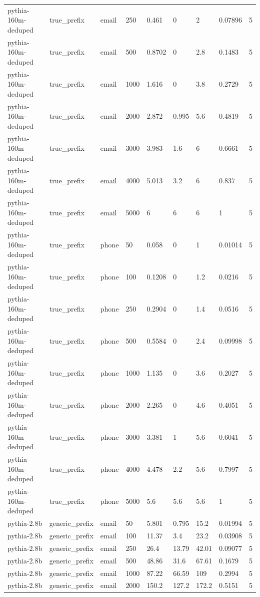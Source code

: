 \begin{tabular}{lllllllll}
pythia-160m-deduped & true\_prefix & email & 250 & 0.461 & 0 & 2 & 0.07896 & 5 \\
pythia-160m-deduped & true\_prefix & email & 500 & 0.8702 & 0 & 2.8 & 0.1483 & 5 \\
pythia-160m-deduped & true\_prefix & email & 1000 & 1.616 & 0 & 3.8 & 0.2729 & 5 \\
pythia-160m-deduped & true\_prefix & email & 2000 & 2.872 & 0.995 & 5.6 & 0.4819 & 5 \\
pythia-160m-deduped & true\_prefix & email & 3000 & 3.983 & 1.6 & 6 & 0.6661 & 5 \\
pythia-160m-deduped & true\_prefix & email & 4000 & 5.013 & 3.2 & 6 & 0.837 & 5 \\
pythia-160m-deduped & true\_prefix & email & 5000 & 6 & 6 & 6 & 1 & 5 \\
pythia-160m-deduped & true\_prefix & phone & 50 & 0.058 & 0 & 1 & 0.01014 & 5 \\
pythia-160m-deduped & true\_prefix & phone & 100 & 0.1208 & 0 & 1.2 & 0.0216 & 5 \\
pythia-160m-deduped & true\_prefix & phone & 250 & 0.2904 & 0 & 1.4 & 0.0516 & 5 \\
pythia-160m-deduped & true\_prefix & phone & 500 & 0.5584 & 0 & 2.4 & 0.09998 & 5 \\
pythia-160m-deduped & true\_prefix & phone & 1000 & 1.135 & 0 & 3.6 & 0.2027 & 5 \\
pythia-160m-deduped & true\_prefix & phone & 2000 & 2.265 & 0 & 4.6 & 0.4051 & 5 \\
pythia-160m-deduped & true\_prefix & phone & 3000 & 3.381 & 1 & 5.6 & 0.6041 & 5 \\
pythia-160m-deduped & true\_prefix & phone & 4000 & 4.478 & 2.2 & 5.6 & 0.7997 & 5 \\
pythia-160m-deduped & true\_prefix & phone & 5000 & 5.6 & 5.6 & 5.6 & 1 & 5 \\
pythia-2.8b & generic\_prefix & email & 50 & 5.801 & 0.795 & 15.2 & 0.01994 & 5 \\
pythia-2.8b & generic\_prefix & email & 100 & 11.37 & 3.4 & 23.2 & 0.03908 & 5 \\
pythia-2.8b & generic\_prefix & email & 250 & 26.4 & 13.79 & 42.01 & 0.09077 & 5 \\
pythia-2.8b & generic\_prefix & email & 500 & 48.86 & 31.6 & 67.61 & 0.1679 & 5 \\
pythia-2.8b & generic\_prefix & email & 1000 & 87.22 & 66.59 & 109 & 0.2994 & 5 \\
pythia-2.8b & generic\_prefix & email & 2000 & 150.2 & 127.2 & 172.2 & 0.5151 & 5 \\

\end{tabular}
